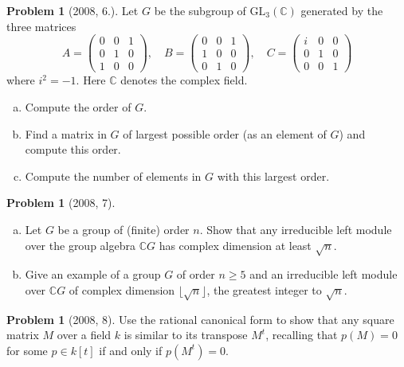 \documentclass{article}
\newcommand{\<}{\langle} %
\renewcommand{\>}{\rangle} %
\theoremstyle{plain}
\theoremstyle{remark}
\theoremstyle{definition}
\newtheorem{examproblem}[equation]{Problem}
\begin{document}
\begin{examproblem}[2008, 6.]
	Let $G$ be the subgroup of $\text{GL}_3(\mathbb C)$ generated by the three
	matrices
	$$
	A=
	\begin{pmatrix}
		0 & 0 & 1\\
		0 & 1 & 0\\
		1 & 0 & 0
	\end{pmatrix},
	\quad B=
	\begin{pmatrix}
		0 & 0 & 1\\
		1 & 0 & 0\\
		0 & 1 & 0
	\end{pmatrix},
	\quad C=
	\begin{pmatrix}
		i & 0 & 0\\
		0 & 1 & 0\\
		0 & 0 & 1
	\end{pmatrix}
	$$
	where $i^2=-1$. Here $\mathbb C$ denotes the complex field.
	\begin{enumerate}[(a)]
		\item Compute the order of $G$.
		\item Find a matrix in $G$ of largest possible order (as an element
			of $G$) and compute this order.
		\item Compute the number of elements in $G$ with this largest
			order.
	\end{enumerate}
\end{examproblem}

\begin{examproblem}[2008, 7]
	\begin{enumerate}[(a)]
		\item Let $G$ be a group of (finite) order $n$. Show that any
			irreducible left module over the group algebra $\mathbb CG$
			has complex dimension at least $\sqrt n$.
		\item Give an example of a group $G$ of order $n\geq5$ and an
			irreducible left module over $\mathbb CG$ of complex dimension
			$\lfloor\sqrt n\rfloor$, the greatest integer to
			$\sqrt n$.
	\end{enumerate}
\end{examproblem}


\begin{examproblem}[2008, 8]
	Use the rational canonical form to show that any square matrix $M$ over
	a field $k$ is similar to its transpose $M^t$, recalling that $p(M)=0$
	for some $p\in k[t]$ if and only if $p(M^t)=0$.
\end{examproblem}
\end{document}
